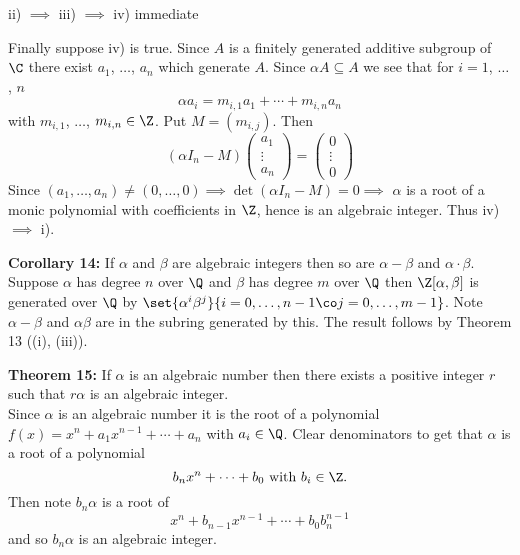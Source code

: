 ii) $\implies$ iii) $\implies$ iv) immediate

Finally suppose iv) is true.  Since $A$ is a finitely generated additive subgroup of $\C$ there exist $a_1$, $\dotsc$, $a_n$ which generate $A$.  Since $\alpha A\subseteq A$ we see that for $i=1$, $\dotsc$, $n$
\[ \alpha a_i = m_{i,1}a_1 + \dotsb + m_{i,n}a_n \]
with $m_{i,1}$, $\dotsc$, $m_{i,n}\in\Z$.  Put $M=(m_{i,j})$.  Then
\[ (\alpha I_n-M)\begin{pmatrix}
a_1 \\
\vdots \\
a_n
\end{pmatrix} = \begin{pmatrix}
0 \\
\vdots \\
0
\end{pmatrix} \]
Since $(a_1,\dotsc,a_n)\neq(0,\dotsc,0)\implies\det(\alpha I_n-M)=0\implies$ $\alpha$ is a root of a monic polynomial with coefficients in $\Z$, hence is an algebraic integer.  Thus iv) $\implies$ i).

\textbf{Corollary 14:} If $\alpha$ and $\beta$ are algebraic integers then so are $\alpha-\beta$ and $\alpha\cdot\beta$. \\
\pf Suppose $\alpha$ has degree $n$ over $\Q$ and $\beta$ has degree $m$ over $\Q$ then $\Z[\alpha,\beta]$ is generated over $\Q$ by $\set{\alpha^i\beta^j}{i=0,\dotsc,n-1\co j=0,\dotsc,m-1}$.  Note $\alpha-\beta$ and $\alpha\beta$ are in the subring generated by this.  The result follows by Theorem 13 ((i), (iii)).

\textbf{Theorem 15:} If $\alpha$ is an algebraic number then there exists a positive integer $r$ such that $r\alpha$ is an algebraic integer. \\
\pf Since $\alpha$ is an algebraic number it is the root of a polynomial $f(x)=x^n+a_1x^{n-1}+\dotsb+a_n$ with $a_i\in\Q$.  Clear denominators to get that $\alpha$ is a root of a polynomial
\[ b_n x^n + \dotsb + b_0 \text{ with } b_i\in\Z . \]
Then note $b_n\alpha$ is a root of
\[ x^n + b_{n-1} x^{n-1} + \dotsb + b_0 b_n^{n-1} \]
and so $b_n\alpha$ is an algebraic integer.